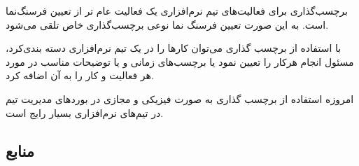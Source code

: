 برچسب‌گذاری برای فعالیت‌های تیم نرم‌افزاری یک فعالیت عام تر از تعیین فرسنگ‌نما است. به این صورت تعیین فرسنگ نما نوعی برچسب‌گذاری خاص تلقی می‌شود.

با استفاده از برچسب گذاری می‌توان کار‌ها را در یک تیم نرم‌افزاری دسته بندی‌کرد، مسئول انجام هر‌کار را تعیین نمود یا برچسب‌های زمانی و یا توضیحات مناسب در مورد  هر فعالیت و کار را به آن اضافه کرد.

امروزه استفاده از برچسب گذاری به صورت فیزیکی و مجازی در بورد‌های مدیریت تیم در تیم‌های نرم‌افزاری بسیار رایج است.

\subsection*{منابع} \ \\





